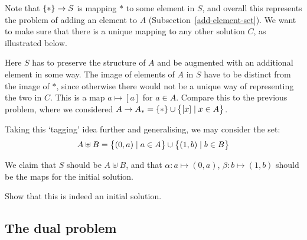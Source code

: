     \begin{center}
    \end{center}
    
    Note that $\{ \ast \} \to S$ is mapping $\ast$ to some element in $S$, and
    overall this represents the problem of adding an element to $A$
    (Subsection~\ref{add-element-set}). We want to make sure that there is a unique
    mapping to any other solution $C$, as illustrated below.
    
    \begin{center}
    \end{center}
    
    Here $S$ has to preserve the structure of $A$ and be augmented with an
    additional element in some way. The image of elements of $A$ in $S$ have to be
    distinct from the image of $\ast$, since otherwise there would not be a unique
    way of representing the two in $C$. This is a map $a \mapsto [a]$ for $a \in A$.
    Compare this to the previous problem, where we considered
    $A \to A_\ast = \{ \ast \} \cup \big\{ [x] \mid x \in A \big\}$.
    
    Taking this `tagging' idea further and generalising, we may consider the set:
    \begin{equation*}
    A \uplus B = \big\{ (0, a) \mid a \in A \big\} \cup
    \big\{ (1, b) \mid b \in B \big\}
    \end{equation*}
    
    We claim that $S$ should be $A \uplus B$, and that $\alpha: a \mapsto (0, a)$,
    $\beta: b \mapsto (1, b)$ should be the maps for the initial solution.
    
    \begin{exercise}
    Show that this is indeed an initial solution.
    \end{exercise}
    
    \subsection{The dual problem}
    
